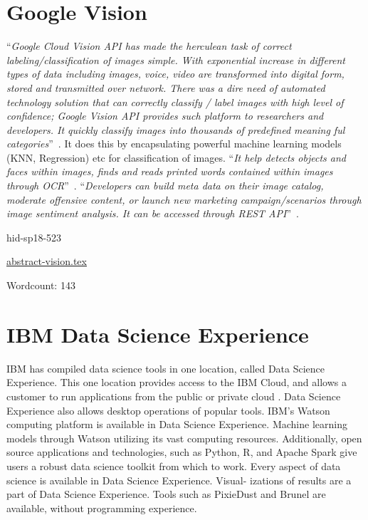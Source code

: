 \section{Google Vision}

\color{blue}``\emph{Google Cloud Vision API has made the herculean task of correct 
labeling/classification of images simple. With exponential increase 
in different types of data including images, voice, video are 
transformed into digital form, stored and transmitted over network. 
There was a dire need of automated technology solution that can 
correctly classify / label images with high level of confidence; 
Google Vision API provides such platform to researchers and developers. 
It quickly classify images into thousands of predefined 
meaning ful categories}''\color{black}~\cite{hid-sp18-523-www-google-vision}. 
It does this by encapsulating powerful machine learning 
models (KNN, Regression) etc for classification of images. 
\color{blue}``\emph{It help detects objects and faces within images, finds and reads 
printed words contained within images through 
OCR}''\color{black}~\cite{hid-sp18-523-www-google-vision}. 
\color{blue}``\emph{Developers can build meta data on their image catalog, moderate 
offensive content, or launch new marketing campaign/scenarios through 
image sentiment analysis. It can be accessed 
through REST API}''\color{black}~\cite{hid-sp18-523-www-google-vision}.



\begin{IU}

hid-sp18-523

\href{https://github.com/cloudmesh-community/hid-sp18-523/blob/master//technology/abstract-vision.tex}{abstract-vision.tex}

 

Wordcount: 143

\end{IU}

\section{IBM Data Science Experience}

IBM has compiled data science tools in one location, 
called Data Science Experience. This one location provides
access to the IBM Cloud, and allows a customer to run 
applications from the public or private cloud 
\cite{hid-sp18-525-dsx}.
Data Science Experience also allows desktop operations 
of popular tools\cite{hid-sp18-525-dsx}.
IBM’s Watson computing platform is available in Data Science
Experience. Machine learning models through Watson utilizing
its vast computing resources. Additionally, open source 
applications and technologies, such as Python, R, and Apache 
Spark give users a robust data science toolkit from which to
work\cite{hid-sp18-525-dsx}.
Every aspect of data science is available in Data Science 
Experience. Visual- izations of results are a part of Data 
Science Experience. Tools such as PixieDust and Brunel are 
available, without programming
experience\cite{hid-sp18-525-dsx}.



